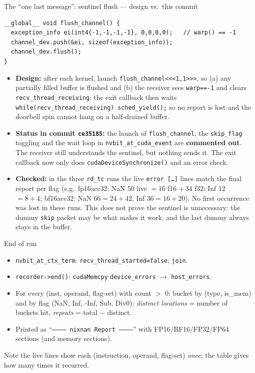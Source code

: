 \documentclass[aspectratio=169,10pt]{beamer}
\begin{document}
\begin{frame}[fragile]{The ``one last message'': sentinel flush --- design vs.\ this commit}
\begin{lstlisting}
__global__ void flush_channel() {
  exception_info ei(int4{-1,-1,-1,-1}, 0,0,0,0);   // warp() == -1
  channel_dev.push(&ei, sizeof(exception_info));
  channel_dev.flush();
}
\end{lstlisting}
\small
\begin{itemize}
\item \textbf{Design:} after each kernel, launch \texttt{flush\_channel<<<1,1>>>}, so (a) any partially filled buffer is flushed and (b) the receiver sees \texttt{warp==-1} and clears \texttt{recv\_thread\_receiving}; the exit callback then waits \texttt{while(recv\_thread\_receiving) sched\_yield();} so no report is lost and the doorbell spin cannot hang on a half-drained buffer.
\item \textbf{Status in commit \texttt{ce35185}:} the launch of \texttt{flush\_channel}, the \texttt{skip\_flag} toggling and the wait loop in \texttt{nvbit\_at\_cuda\_event} are \textbf{commented out}. The receiver still understands the sentinel, but nothing sends it. The exit callback now only does \texttt{cudaDeviceSynchronize()} and an error check.
\item \textbf{Checked:} in the three \texttt{rd\_tc} runs the live \texttt{error [\ldots]} lines match the final report per flag (e.g.\ fp16acc32: NaN 50 live $=16$ f16 $+\,34$ f32; Inf 12 $=8+4$; bf16acc32: NaN $66=24+42$, Inf $36=16+20$). No first occurrence was lost in these runs. This does not prove the sentinel is unnecessary: the dummy \texttt{skip} packet may be what makes it work, and the last dummy always stays in the buffer.
\end{itemize}
\end{frame}

\begin{frame}{End of run}
\small
\begin{itemize}
\item \texttt{nvbit\_at\_ctx\_term}: \texttt{recv\_thread\_started=false}; \texttt{join}.
\item \texttt{recorder->end()}: \texttt{cudaMemcpy} \texttt{device\_errors} $\to$ \texttt{host\_errors}.
\item For every (inst, operand, flag-set) with count $>$ 0: bucket by (type, is\_mem) and by flag (NaN, Inf, -Inf, Sub, Div0): \emph{distinct locations} = number of buckets hit, \emph{repeats} = total $-$ distinct.
\item Printed as ``\texttt{------------ nixnan Report -----------}'' with FP16/BF16/FP32/FP64 sections (and memory sections).
\end{itemize}
Note the live lines show each (instruction, operand, flag-set) \emph{once}; the table gives how many times it recurred.
\end{frame}
\end{document}
